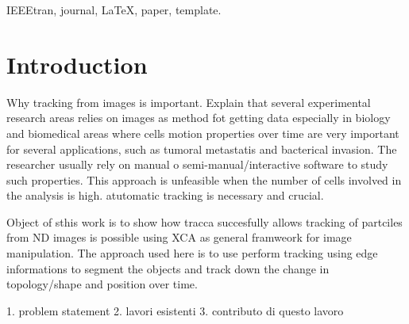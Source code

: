 \documentclass[conference]{IEEEtran}
\begin{document}
\maketitle


\begin{abstract}

\end{abstract}

\begin{IEEEkeywords}
IEEEtran, journal, \LaTeX, paper, template.
\end{IEEEkeywords}






%
\IEEEpeerreviewmaketitle



\section{Introduction}
Why tracking from images is important. Explain that several experimental research areas relies on images as method fot getting data especially in biology and biomedical areas where cells motion properties over time are very important for several applications, such as tumoral metastatis and bacterical invasion.
The researcher usually rely on manual o semi-manual/interactive software to study such properties. This approach is unfeasible when the number of cells involved in the analysis is high. atutomatic tracking is necessary and crucial.

Object of sthis work is to show how tracca succesfully allows tracking of partciles from ND images is possible using XCA as general framweork for image manipulation.
The approach used here is to use perform tracking using edge informations to segment the objects and track down the change in topology/shape and position over time. 




1. problem statement
2. lavori esistenti
3. contributo di questo lavoro
\end{document}
